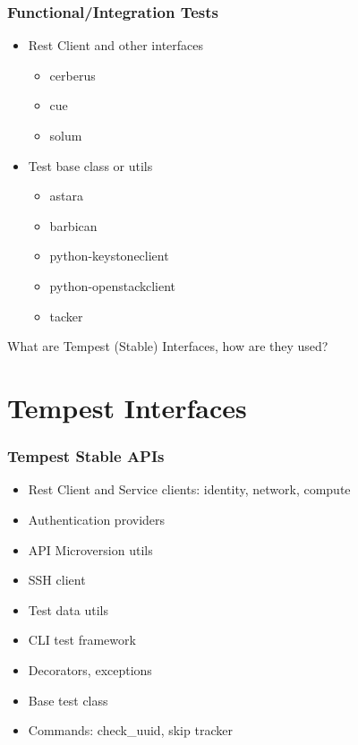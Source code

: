 \documentclass[aspectratio=169,11pt,hyperref={colorlinks=true}]{beamer}
\begin{document}
\begin{frame}
    \frametitle{Functional/Integration Tests}
    \begin{itemize}
        \item{Rest Client and other interfaces}
            \begin{itemize}
                \item{cerberus}
                \item{cue}
                \item{solum}
            \end{itemize}
         \item{Test base class or utils}
            \begin{itemize}
                \item{astara}
                \item{barbican}
                \item{python-keystoneclient}
                \item{python-openstackclient}
                \item{tacker}
            \end{itemize}
    \end{itemize}
\end{frame}

\begin{frame}[c]
    \begin{center}
        \large What are Tempest (Stable) Interfaces, how are they used?
    \end{center}
\end{frame}

\section{Tempest Interfaces}
\begin{frame}
    \frametitle{Tempest Stable APIs}
    \begin{itemize}
        \item{Rest Client and Service clients: identity, network, compute}
        \item{Authentication providers}
        \item{API Microversion utils}
        \item{SSH client}
        \item{Test data utils}
        \item{CLI test framework}
        \item{Decorators, exceptions}
        \item{Base test class}
        \item{Commands: check\_uuid, skip tracker}
    \end{itemize}
\end{frame}
\end{document}
